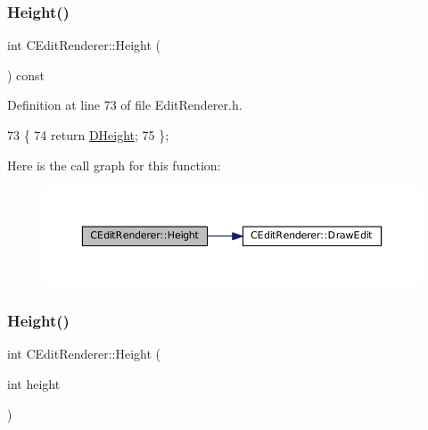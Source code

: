 \subsubsection{\texorpdfstring{Height()}{Height()}\hspace{0.1cm}{\footnotesize\ttfamily [1/2]}}
{\footnotesize\ttfamily int C\+Edit\+Renderer\+::\+Height (\begin{DoxyParamCaption}{ }\end{DoxyParamCaption}) const\hspace{0.3cm}{\ttfamily [inline]}}



Definition at line 73 of file Edit\+Renderer.\+h.


\begin{DoxyCode}
73                           \{
74             \textcolor{keywordflow}{return} \hyperlink{classCEditRenderer_ade8dedb4f9790d28b38da8ef20a171cb}{DHeight};    
75         \};
\end{DoxyCode}
Here is the call graph for this function\+:
\nopagebreak
\begin{figure}[H]
\begin{center}
\leavevmode
\includegraphics[width=350pt]{classCEditRenderer_ad5ad32a8ae2372e21bb9365a6b6d0f59_cgraph}
\end{center}
\end{figure}
\hypertarget{classCEditRenderer_ab3c2442f35049d3fa57a173e68043bfa}{}\label{classCEditRenderer_ab3c2442f35049d3fa57a173e68043bfa} 
\subsubsection{\texorpdfstring{Height()}{Height()}\hspace{0.1cm}{\footnotesize\ttfamily [2/2]}}
{\footnotesize\ttfamily int C\+Edit\+Renderer\+::\+Height (\begin{DoxyParamCaption}\item[{int}]{height }\end{DoxyParamCaption})}




